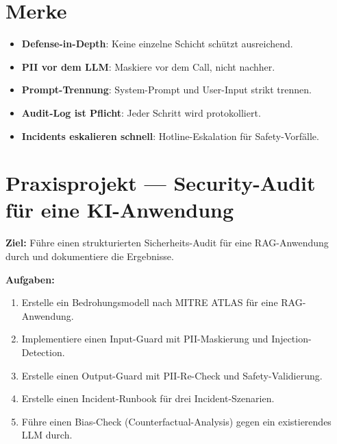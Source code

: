 \section{Merke}




\par\mbox{}\par
\begin{merkeEnv}
\begin{itemize}
     \item \textbf{Defense-in-Depth}: Keine einzelne Schicht schützt ausreichend.
     \item \textbf{PII vor dem LLM}: Maskiere vor dem Call, nicht nachher.
     \item \textbf{Prompt-Trennung}: System-Prompt und User-Input strikt trennen.
     \item \textbf{Audit-Log ist Pflicht}: Jeder Schritt wird protokolliert.
     \item \textbf{Incidents eskalieren schnell}: Hotline-Eskalation für Safety-Vorfälle.
\end{itemize}
\end{merkeEnv}

\section{Praxisprojekt --- Security-Audit für eine KI-Anwendung}

\textbf{Ziel:} Führe einen strukturierten Sicherheits-Audit für eine RAG-Anwendung durch und dokumentiere die Ergebnisse.

\textbf{Aufgaben:}
\begin{enumerate}[leftmargin=*]
     \item Erstelle ein Bedrohungsmodell nach MITRE ATLAS für eine RAG-Anwendung.
     \item Implementiere einen Input-Guard mit PII-Maskierung und Injection-Detection.
     \item Erstelle einen Output-Guard mit PII-Re-Check und Safety-Validierung.
     \item Erstelle einen Incident-Runbook für drei Incident-Szenarien.
     \item Führe einen Bias-Check (Counterfactual-Analysis) gegen ein existierendes LLM durch.
\end{enumerate}

